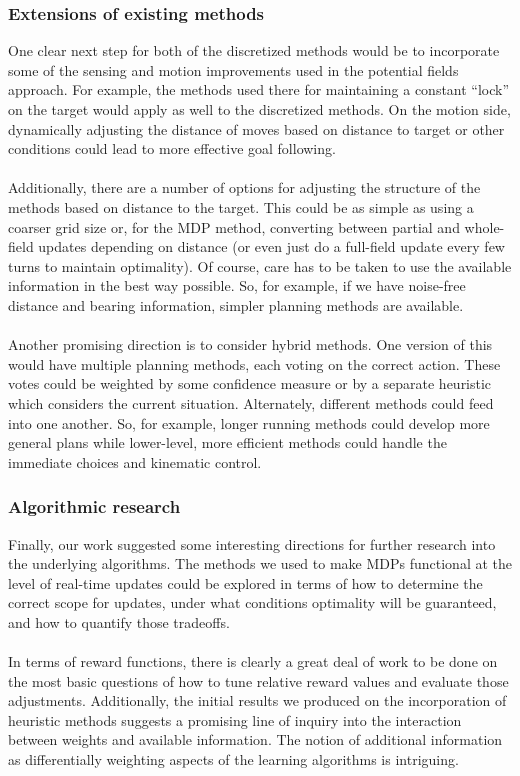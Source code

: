 \documentclass{aiaa-tc}%
\begin{document}
\subsubsection{Extensions of existing methods}

One clear next step for both of the discretized methods would be to incorporate some of the sensing and motion improvements used in the potential fields approach. For example, the methods used there for maintaining a constant ``lock'' on the target would apply as well to the discretized methods. On the motion side, dynamically adjusting the distance of moves based on distance to target or other conditions could lead to more effective goal following.\\ \\
Additionally, there are a number of options for adjusting the structure of the methods based on distance to the target. This could be as simple as using a coarser grid size or, for the MDP method, converting between partial and whole-field updates depending on distance (or even just do a full-field update every few turns to maintain optimality). Of course, care has to be taken to use the available information in the best way possible. So, for example, if we have noise-free distance and bearing information, simpler planning methods are available.\\ \\
Another promising direction is to consider hybrid methods. One version of this would have multiple planning methods, each voting on the correct action. These votes could be weighted by some confidence measure or by a separate heuristic which considers the current situation. Alternately, different methods could feed into one another. So, for example, longer running methods could develop more general plans while lower-level, more efficient methods could handle the immediate choices and kinematic control.

\subsubsection{Algorithmic research}

Finally, our work suggested some interesting directions for further research into the underlying algorithms. The methods we used to make MDPs functional at the level of real-time updates could be explored in terms of how to determine the correct scope for updates, under what conditions optimality will be guaranteed, and how to quantify those tradeoffs.\\ \\
In terms of reward functions, there is clearly a great deal of work to be done on the most basic questions of how to tune relative reward values and evaluate those adjustments. Additionally, the initial results we produced on the incorporation of heuristic methods suggests a promising line of inquiry into the interaction between weights and available information. The notion of additional information as differentially weighting aspects of the learning algorithms is intriguing.


% 

% 
\end{document}
